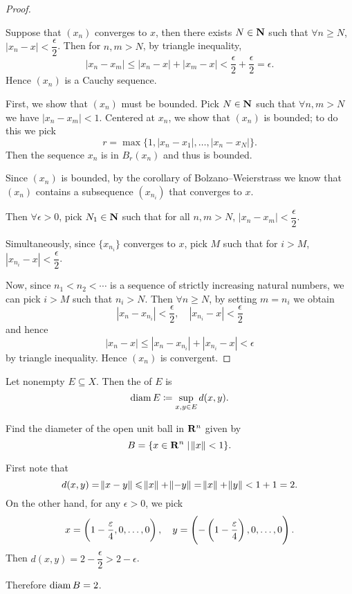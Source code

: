 \begin{proof} \

\fbox{$\implies$} Suppose that $(x_n)$ converges to $x$, then there exists $N\in\mathbf N$ such that $\forall n\ge N$, $|x_n-x|<\dfrac{\epsilon}{2}$. Then for $n,m>N$, by triangle inequality,
\[|x_n-x_m|\le|x_n-x|+|x_m-x|<\frac{\epsilon}{2}+\frac{\epsilon}{2}=\epsilon.\]
Hence $(x_n)$ is a Cauchy sequence.

\fbox{$\impliedby$} First, we show that $(x_n)$ must be bounded. 
Pick $N\in\mathbf N$ such that $\forall n,m>N$ we have $|x_n-x_m|<1$. 
Centered at $x_n$, we show that $(x_n)$ is bounded; to do this we pick
\[r=\max\{1,|x_n-x_1|,\dots,|x_n-x_N|\}.\]
Then the sequence ${x_n}$ is in $B_r(x_n)$ and thus is bounded.

Since $(x_n)$ is bounded, by the corollary of Bolzano--Weierstrass we know that $(x_n)$ contains a subsequence $(x_{n_i})$ that converges to $x$.

Then $\forall\epsilon>0$, pick $N_1\in\mathbf N$ such that for all $n,m>N$, $|x_n-x_m|<\dfrac{\epsilon}{2}$.

Simultaneously, since $\{x_{n_i}\}$ converges to $x$, pick $M$ such that for $i>M$, $|x_{n_i}-x|<\dfrac{\epsilon}{2}$.

Now, since $n_1<n_2<\cdots$ is a sequence of strictly increasing natural numbers, we can pick $i>M$ such that $n_i>N$. Then $\forall n\ge N$, by setting $m=n_i$ we obtain
\[ |x_n-x_{n_i}| < \frac{\epsilon}{2}, \quad |x_{n_i}-x| < \frac{\epsilon}{2} \]
and hence
\[|x_n-x|\le|x_n-x_{n_i}|+|x_{n_i}-x|<\epsilon\]
by triangle inequality. Hence $(x_n)$ is convergent.
\end{proof}

\begin{definition}[Diameter]
Let nonempty $E\subseteq X$. Then the  of $E$ is
\[\operatorname{diam} E\coloneqq\sup_{x,y\in E}d(x,y).\]
\end{definition}

\begin{exercise}
Find the diameter of the open unit ball in $\mathbf R^n$ given by
\[ B=\{x\in\mathbf R^n \mid \norm{x}<1\}. \]
\end{exercise}

\begin{solution}
First note that
\[ d(x,y)=\norm{x-y}\leqslant\norm{x}+\norm{-y}=\norm{x}+\norm{y}<1+1=2. \]
On the other hand, for any $\epsilon>0$, we pick
\[ x=\left(1-\frac{\varepsilon}{4},0,\dots,0\right), \quad y=\left(-\left(1-\frac{\varepsilon}{4}\right),0,\dots,0\right). \]
Then $d(x,y)=2-\dfrac{\epsilon}{2}>2-\epsilon$.

Therefore $\operatorname{diam} B=2$.
\end{solution}

